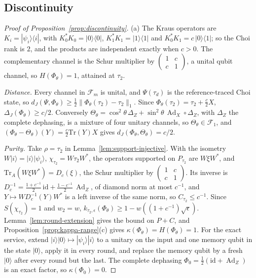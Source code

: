 \documentclass[11pt,a4paper]{article}
\theoremstyle{plain}
\theoremstyle{definition}
\theoremstyle{remark}
\DeclareMathOperator{\Ad}{Ad}
\newcommand{\dJ}{d_J}
\begin{document}
\subsection{Discontinuity}

\begin{proof}[Proof of Proposition~\ref{prop:discontinuity}]
(a) The Kraus operators are $K_i=|\psi_i\rangle\langle i|$, with $K_0^*K_0=|0\rangle\langle0|$, $K_1^*K_1=|1\rangle\langle1|$ and $K_0^*K_1=c\,|0\rangle\langle1|$; so the Choi
rank is $2$, and the products are independent exactly when $c>0$. The complementary channel is the Schur multiplier by
$\left(\begin{smallmatrix}1&c\\c&1\end{smallmatrix}\right)$, a unital qubit channel, so $H(\Phi_\theta)=1$, attained at $\tau_2$.

\emph{Distance.} Every channel in $\mathcal F_m$ is unital, and $\Psi(\tau_d)$ is the reference-traced Choi state, so $\dJ(\Psi,\Phi_\theta)\ge\frac12\|\Phi_\theta(\tau_2)-\tau_2\|_1$.
Since $\Phi_\theta(\tau_2)=\tau_2+\frac c2X$, $\Delta_J(\Phi_\theta)\ge c/2$. Conversely
$\Theta_\theta=\cos^2\theta\,\Delta_Z+\sin^2\theta\,\Ad_X\circ\Delta_Z$, with $\Delta_Z$ the complete dephasing, is a mixture of four unitary channels, so
$\Theta_\theta\in\mathcal F_1$, and $(\Phi_\theta-\Theta_\theta)(Y)=\frac c2\mathrm{Tr}(Y)X$ gives $\dJ(\Phi_\theta,\Theta_\theta)=c/2$.

\emph{Purity.} Take $\rho=\tau_2$ in Lemma~\ref{lem:support-injective}. With the isometry $W|i\rangle=|i\rangle|\psi_i\rangle$, $\chi_{\tau_2}=W\tau_2W^*$, the
operators supported on $P_{\tau_2}$ are $W\xi W^*$, and $\mathrm{Tr}_A(W\xi W^*)=D_c(\xi)$, the Schur multiplier by
$\left(\begin{smallmatrix}1&c\\c&1\end{smallmatrix}\right)$. Its inverse is $D_c^{-1}=\frac{1+c^{-1}}2\,\mathrm{id}+\frac{1-c^{-1}}2\,\Ad_Z$, of diamond norm at most
$c^{-1}$, and $Y\mapsto WD_c^{-1}(Y)W^*$ is a left inverse of the same norm, so $C_{\tau_2}\le c^{-1}$. Since $S(\chi_{\tau_2})=1$ and $w_2=w$, $k_{\tau_2,\epsilon}(\Phi_\theta)\ge1-w((1+c^{-1})\sqrt\epsilon)$. Lemma~\ref{lem:round-extension}
gives the bound on $P+C$, and Proposition~\ref{prop:kappa-range}(c) gives $\kappa(\Phi_\theta)=H(\Phi_\theta)=1$. For the exact service, extend
$|i\rangle|0\rangle\mapsto|\psi_i\rangle|i\rangle$ to a unitary on the input and one memory qubit in the state $|0\rangle$, apply it in every round, and
replace the memory qubit by a fresh $|0\rangle$ after every round but the last. The complete dephasing $\Phi_0=\frac12(\mathrm{id}+\Ad_Z)$ is an exact
factor, so $\kappa(\Phi_0)=0$.


\end{proof}
\end{document}
